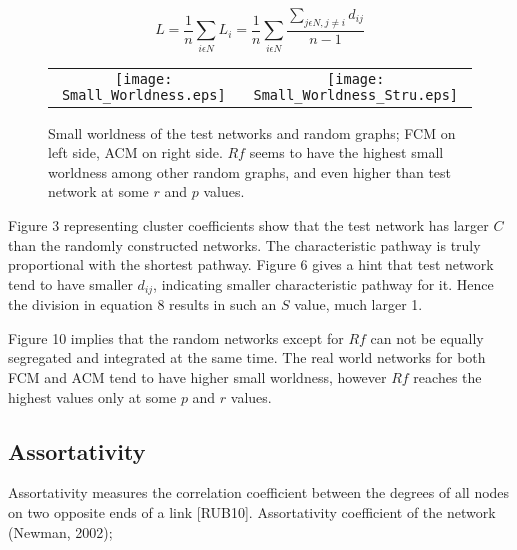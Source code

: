 \documentclass[12pt]{article}
\begin{document}
\begin{equation}
L = \frac{1}{n}\sum\limits_{i \epsilon N} L_i = \frac{1}{n}\sum\limits_{i \epsilon N} \frac{\sum\limits_{j \epsilon N, j \neq i }d_{ij}}{n-1 } 
\end{equation}

\begin{figure}[htp]

  \centering

    \begin{tabular}{cc}


    \texttt{[image: Small\_Worldness.eps]} &

    \texttt{[image: Small\_Worldness\_Stru.eps]}\\

  \end{tabular}

 \label{figur}\caption{Small worldness of the test networks and random graphs; FCM on left side, ACM on right side. $Rf$ seems to have the highest small worldness among other random graphs, and even higher than test network at some $r$ and $p$ values. }
 
\end{figure}



Figure 3 representing cluster coefficients show that the test network has larger $C$ than the randomly constructed networks. The characteristic pathway is truly proportional with the shortest pathway. Figure 6 gives a hint that test network tend to have smaller $d_{ij}$, indicating smaller characteristic pathway for it. Hence the division in equation 8 results in such an $S$ value, much larger 1.

Figure 10 implies that the random networks except for $Rf$ can not be equally segregated and integrated at the same time. The real world networks for both  FCM and ACM tend to have higher small worldness, however $Rf$ reaches the highest values only at some $p$ and $r$ values.  

\subsection{Assortativity}

Assortativity measures the correlation coefficient between the degrees of all nodes on two opposite ends of a link [RUB10]. Assortativity coefficient of the network (Newman, 2002);
\end{document}
